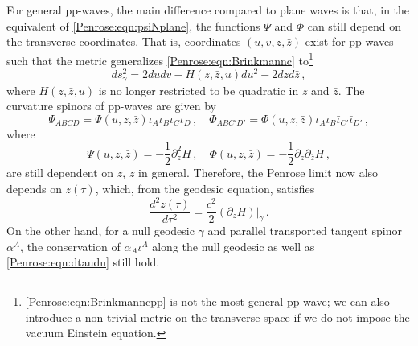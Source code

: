 For general pp-waves, the main difference compared to plane waves is that, in the equivalent of
\eqref{Penrose:eqn:psiNplane}, the functions $\Psi$ and $\Phi$ can still depend on the transverse coordinates. That is,
coordinates $(u,v,z,\bar{z})$ exist for pp-waves such that the metric generalizes \eqref{Penrose:eqn:Brinkmannc}
to\footnote{\eqref{Penrose:eqn:Brinkmanncpp} is not the most general pp-wave; we can also introduce a non-trivial metric on
the transverse space if we do not impose the vacuum Einstein equation.}
\begin{equation}\label{Penrose:eqn:Brinkmanncpp}
ds_{\gamma}^2 = 2 du dv -H(z,\bar{z},u) du^2  - 2 dz d\bar{z}  \, ,
\end{equation}
where $H(z,\bar{z},u)$ is no longer restricted to be quadratic in $z$ and $\bar{z}$. The curvature spinors of pp-waves are given by
\begin{equation}\label{Penrose:eqn:psiNpp}
\Psi_{ABCD} = \Psi(u,z,\bar{z}) \iota_{A}\iota_{B}\iota_{C}\iota_{D} \, , \quad \Phi_{ABC'D'} = \Phi(u,z,\bar{z}) \iota_{A}\iota_{B}\bar{\iota}_{C'}\bar{\iota}_{D'} \, ,
\end{equation}
where
\begin{equation}\label{Penrose:eqn:ppcurvaturespinors}
\Psi(u,z,\bar{z}) = -\frac{1}{2}\partial_z^2 H \, , \quad  	\Phi(u,z,\bar{z}) = -\frac{1}{2}\partial_z \partial_{\bar{z}} H \, ,
\end{equation}
are still dependent on $z$, $\bar{z}$ in general. Therefore, the Penrose limit now also depends on $z(\tau)$, which, from the geodesic equation, satisfies
\begin{equation}
\frac{d^2 z(\tau)}{d \tau^2} = \frac{c^2}{2}\left(\partial_z H\right)|_{\gamma}\, .
\end{equation}
On the other hand, for a null geodesic $\gamma$ and parallel transported tangent spinor $\alpha^A$, the conservation of $\alpha_{A} \iota^{A}$ along the null geodesic as well as  \eqref{Penrose:eqn:dtaudu} still hold.

